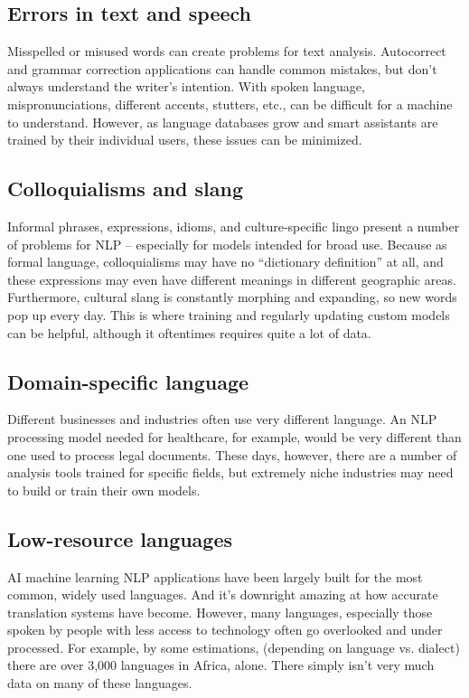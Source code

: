 \documentclass[11pt]{article}
\begin{document}
\subsection{Errors in text and speech}
\label{sec:orgc9f929f}
Misspelled or misused words can create problems for text analysis. Autocorrect and
grammar correction applications can handle common mistakes, but don’t always
understand the writer’s intention.
With spoken language, mispronunciations, different accents, stutters, etc., can
be difficult for a machine to understand. However, as language databases grow and
smart assistants are trained by their individual users, these issues can be minimized.
\subsection{Colloquialisms and slang}
\label{sec:orgeb7c5ee}
Informal phrases, expressions, idioms, and culture-specific lingo present a number
of problems for NLP – especially for models intended for broad use. Because as formal
language, colloquialisms may have no “dictionary definition” at all, and these
expressions may even have different meanings in different geographic areas.
Furthermore, cultural slang is constantly morphing and expanding, so new words
pop up every day.
This is where training and regularly updating custom models can be helpful,
although it oftentimes requires quite a lot of data.
\subsection{Domain-specific language}
\label{sec:org994c07d}
Different businesses and industries often use very different language. An NLP
processing model needed for healthcare, for example, would be very different than
one used to process legal documents. These days, however, there are a number of
analysis tools trained for specific fields, but extremely niche industries may need
to build or train their own models.
\subsection{Low-resource languages}
\label{sec:org2e2070c}
AI machine learning NLP applications have been largely built for the most common,
widely used languages. And it’s downright amazing at how accurate translation systems
have become. However, many languages, especially those spoken by people with less
access to technology often go overlooked and under processed. For example, by some
estimations, (depending on language vs. dialect) there are over 3,000 languages in
Africa, alone. There simply isn’t very much data on many of these languages.
\end{document}

